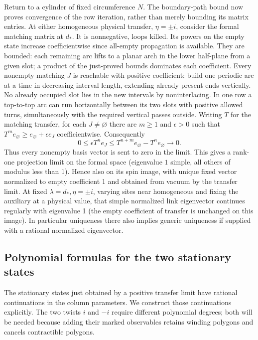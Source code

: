 Return to a cylinder of fixed circumference $N$. The boundary-path bound
now proves convergence of the row iteration, rather than merely bounding
its matrix entries. At either homogeneous physical transfer,
\(\eta=\pm i\), consider the formal matching matrix at \(d_*\). It is nonnegative, loops killed. Its powers on the empty state increase coefficientwise since all-empty propagation is available. They are bounded: each remaining arc lifts to a planar arch in the lower half-plane from a given slot; a product of the just-proved bounds dominates each coefficient. Every nonempty matching \(J\) is reachable with positive coefficient: build one periodic arc at a time in decreasing interval length, extending already present ends vertically. No already occupied slot lies in the new intervals by noninterlacing. In one row a top-to-top arc can run horizontally between its two slots with positive allowed turns, simultaneously with the required vertical passes outside. Writing $T$ for the matching transfer, for each $J\ne\varnothing$
there are $m\ge1$ and $\epsilon>0$ such that
$T^m e_\varnothing\ge e_\varnothing+\epsilon e_J$ coefficientwise.
Consequently
\[
 0\le \epsilon T^n e_J
 \le T^{n+m}e_\varnothing-T^n e_\varnothing\longrightarrow0.
\]
Thus every nonempty basis vector is sent to zero in the limit. This gives a rank-one projection limit on the formal space (eigenvalue \(1\) simple, all others of modulus less than 1). Hence also on its spin image, with unique fixed vector normalized to empty coefficient 1 and obtained from vacuum by the transfer limit. At fixed \(\lambda=d_*,\eta=\pm i\), varying sites near homogeneous and fixing the auxiliary at a physical value, that simple normalized link eigenvector continues regularly with eigenvalue 1 (the empty coefficient of transfer is unchanged on this image). In particular uniqueness there also implies generic uniqueness if supplied with a rational normalized eigenvector.

\subsection{Polynomial formulas for the two stationary states}\label{c4:vacua}

The stationary states just obtained by a positive transfer limit have
rational continuations in the column parameters. We construct those
continuations explicitly. The two twists $i$ and $-i$ require different
polynomial degrees; both will be needed because adding their marked
observables retains winding polygons and cancels contractible polygons.

